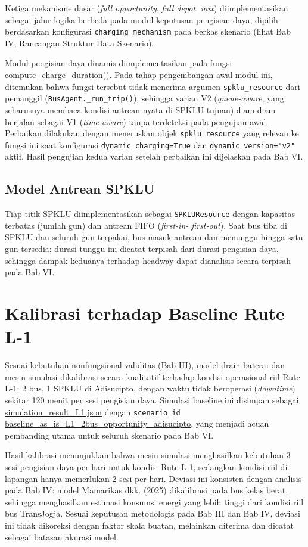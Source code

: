 Ketiga mekanisme dasar (\textit{full opportunity}, \textit{full depot},
\textit{mix}) diimplementasikan sebagai jalur logika berbeda pada modul
keputusan pengisian daya, dipilih berdasarkan konfigurasi
\texttt{charging\_mechanism} pada berkas skenario (lihat Bab IV, Rancangan
Struktur Data Skenario).

Modul pengisian daya dinamis diimplementasikan pada fungsi
\url{compute_charge_duration()}. Pada tahap pengembangan awal modul
ini, ditemukan bahwa fungsi tersebut tidak menerima argumen
\texttt{spklu\_resource} dari pemanggil (\texttt{BusAgent.\_run\_trip()}),
sehingga varian V2 (\textit{queue-aware}, yang seharusnya membaca kondisi
antrean nyata di SPKLU tujuan) diam-diam berjalan sebagai V1
(\textit{time-aware}) tanpa terdeteksi pada pengujian awal. Perbaikan
dilakukan dengan meneruskan objek \texttt{spklu\_resource} yang relevan ke
fungsi ini saat konfigurasi \texttt{dynamic\_charging=True} dan
\texttt{dynamic\_version="v2"} aktif. Hasil pengujian kedua varian setelah
perbaikan ini dijelaskan pada Bab VI.

\subsection{Model Antrean SPKLU}

Tiap titik SPKLU diimplementasikan sebagai \texttt{SPKLUResource} dengan
kapasitas terbatas (jumlah gun) dan antrean FIFO (\textit{first-in-
	first-out}). Saat bus tiba di SPKLU dan seluruh gun terpakai, bus masuk
antrean dan menunggu hingga satu gun tersedia; durasi tunggu ini dicatat
terpisah dari durasi pengisian daya, sehingga dampak keduanya terhadap
headway dapat dianalisis secara terpisah pada Bab VI.

\section{Kalibrasi terhadap Baseline Rute L-1}

Sesuai kebutuhan nonfungsional validitas (Bab III), model drain baterai
dan mesin simulasi dikalibrasi secara kualitatif terhadap kondisi
operasional riil Rute L-1: 2 bus, 1 SPKLU di Adisucipto, dengan waktu
tidak beroperasi (\textit{downtime}) sekitar 120 menit per sesi pengisian
daya. Simulasi baseline ini disimpan sebagai
\url{simulation_result_L1.json} dengan \texttt{scenario\_id}
\url{baseline_as_is_L1_2bus_opportunity_adisucipto}, yang menjadi
acuan pembanding utama untuk seluruh skenario pada Bab VI.

Hasil kalibrasi menunjukkan bahwa mesin simulasi menghasilkan kebutuhan 3
sesi pengisian daya per hari untuk kondisi Rute L-1, sedangkan kondisi
riil di lapangan hanya memerlukan 2 sesi per hari. Deviasi ini konsisten
dengan analisis pada Bab IV: model Mamarikas dkk. (2025) dikalibrasi pada
bus kelas berat, sehingga menghasilkan estimasi konsumsi energi yang lebih
tinggi dari kondisi riil bus TransJogja. Sesuai keputusan metodologis pada
Bab III dan Bab IV, deviasi ini tidak dikoreksi dengan faktor skala buatan,
melainkan diterima dan dicatat sebagai batasan akurasi model.

